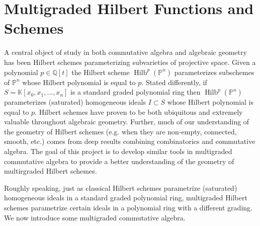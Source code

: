 \documentclass[11pt,reqno]{amsart}
\theoremstyle{remark}
\newcommand{\Hilb}{\operatorname{Hilb}}
\newcommand{\C}{\mathbb{C}}
\newcommand{\K}{\mathbb{K}}
\renewcommand{\P}{\mathbb{P}}
\newcommand{\Q}{\mathbb{Q}}
\begin{document}
\section{Multigraded Hilbert Functions and Schemes}\label{sec:mg-hilb-schemes}

A central object of study in both commutative algebra and algebraic geometry has been Hilbert schemes parameterizing subvarieties of projective space. Given a polynomial $p\in\Q[t]$ the Hilbert scheme $\Hilb^{p}(\P^{n})$ parameterizes subschemes of $\P^{n}$ whose Hilbert polynomial is equal to $p$. Stated differently, if $S=\K[x_{0},x_{1},\ldots,x_{n}]$ is a standard graded polynomial ring then $\Hilb^{p}(\P^{n})$ parameterizes (saturated) homogeneous ideals $I\subset S$ whose Hilbert polynomial is equal to $p$. Hilbert schemes have proven to be both ubiquitous and extremely valuable throughout algebraic geometry. Further, much of our understanding of the geometry of Hilbert schemes (e.g. when they are non-empty, connected, smooth, etc.) comes from deep results combining combinatorics and commutative algebra. The goal of this project is to develop similar tools in multigraded commutative algebra to provide a better understanding of the geometry of multirgraded Hilbert schemes. 



Roughly speaking, just as classical Hilbert schemes parametrize (saturated) homogeneous ideals in a standard graded polynomial ring, multigraded Hilbert schemes parametrize certain ideals in a polynomial ring with a different grading. We now introduce some multigraded commutative algebra. %


\end{document}
